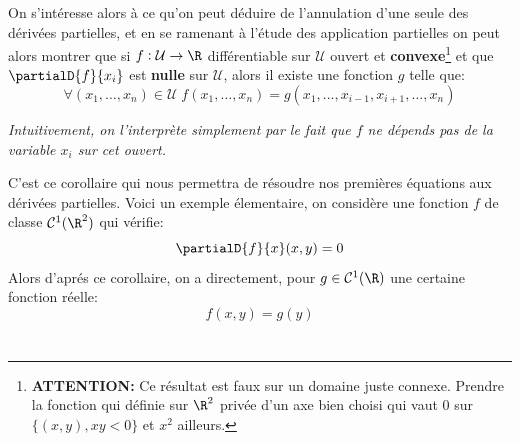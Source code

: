 \subsection*{}
On s'intéresse alors à ce qu'on peut déduire de l'annulation d'une seule des dérivées partielles, et en se ramenant à l'étude des application partielles on peut alors montrer que si \(f : \mathcal{U} \rightarrow \R\) différentiable sur \(\mathcal{U}\) ouvert et \textbf{convexe}\footnote[2]{\textbf{ATTENTION:} Ce résultat est faux sur un domaine juste connexe. Prendre la fonction qui définie sur \(\R^2\) privée d'un axe bien choisi qui vaut \(0\) sur \(\{ (x, y), xy < 0\}\) et \(x^2\) ailleurs.} et que \(\partialD{f}{x_i}\) est \textbf{nulle} sur \(\mathcal{U}\), alors il existe une fonction \(g\) telle que:
\[
   \forall (x_1, \ldots, x_n) \in \mathcal{U} \; f(x_1, \ldots, x_n) = g(x_1, \ldots, x_{i-1}, x_{i+1}, \ldots, x_n) 
\]
\begin{center}
   \textit{Intuitivement, on l'interprète simplement par le fait que \(f\) ne dépends pas de la variable \(x_i\) sur cet ouvert.}
\end{center}
C'est ce corollaire qui nous permettra de résoudre nos premières équations aux dérivées partielles. Voici un exemple élementaire, on considère une fonction \(f\) de classe \(\mathcal{C}^1(\R^2)\) qui vérifie:
\[
   \partialD{f}{x}(x, y) = 0   
\]
Alors d'aprés ce corollaire, on a directement, pour \(g \in \mathcal{C}^1(\R)\) une certaine fonction réelle:
\[
   f(x, y) = g(y)   
\]

\chapter*{}

